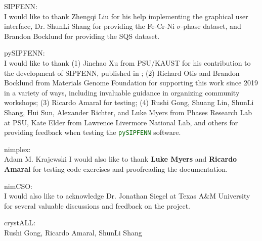 \documentclass[letterpaper, 12pt]{report}
\let\oldtexttt\texttt
\renewcommand{\texttt}[1]{\oldtexttt{\textcolor{darkgreen}{#1}}}
\begin{document}
SIPFENN:\\
I would like to thank Zhengqi Liu for his help implementing the graphical user interface, Dr. ShunLi Shang for providing the Fe-Cr-Ni $\sigma$-phase dataset, and Brandon Bocklund for providing the SQS dataset.

pySIPFENN:\\
I would like to thank (1) Jinchao Xu from PSU/KAUST for his contribution to the development of SIPFENN, published in \cite{Krajewski2022ExtensibleNetworks}; (2) Richard Otis and Brandon Bocklund from Materials Genome Foundation for supporting this work since 2019 in a variety of ways, including invaluable guidance in organizing community workshops; (3) Ricardo Amaral for testing; (4) Rushi Gong, Shuang Lin, ShunLi Shang, Hui Sun, Alexander Richter, and Luke Myers from Phases Research Lab at PSU, Kate Elder from Lawrence Livermore National Lab, and others for providing feedback when testing the \texttt{pySIPFENN} software.

nimplex:\\
Adam M. Krajewski 
I would also like to thank \textbf{Luke Myers} and \textbf{Ricardo Amaral} for testing code exercises and proofreading the documentation.

nimCSO:\\
I would also like to acknowledge Dr. Jonathan Siegel at Texas A\&M University for several valuable discussions and feedback on the project.

crystALL:\\
Rushi Gong, Ricardo Amaral, ShunLi Shang 



\newpage
\setlength\parindent{6pt} %

























\end{document}
